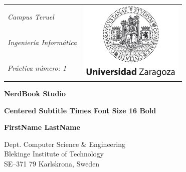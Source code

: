 \documentclass[a4paper,oneside]{report}
\begin{document}
\pagestyle{plain}


{\pagestyle{empty}
\changepage{5cm}{1cm}{-0.5cm}{-0.5cm}{}{-2cm}{}{}{}
\noindent
{\small
\begin{tabular}{p{} p{}}
\textit{Campus Teruel}&\multirow{4}{*}{\includegraphics[width=5cm]{./images/logo.png}}\\
\textit{Ingeniería Informática}\\
\textit{Práctica número: 1}\\
\end{tabular}}

\begin{center}

\par\vspace {7cm}

{\Huge\textbf{NerdBook Studio}}

\par\vspace {0.5cm}

{\Large\textbf{Centered Subtitle Times Font Size 16 Bold}}

\par\vspace {3cm}

{\Large\textbf{FirstName LastName}}
\par\vspace {7cm}

\end{center}

\noindent%
{\small Dept. Computer Science \& Engineering \\
Blekinge Institute of Technology\\
SE--371 79 Karlskrona, Sweden}

\clearpage
}
\tableofcontents
\end{document}
